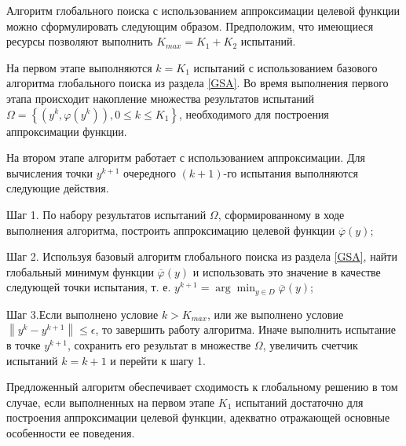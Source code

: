 \documentclass[mathematics,article,accept,pdftex,moreauthors]{Definitions/mdpi}
\begin{document}
Алгоритм глобального поиска с использованием аппроксимации целевой функции можно сформулировать следующим образом.
Предположим, что имеющиеся ресурсы позволяют выполнить $K_{max} = K_1 + K_2$ испытаний.

На первом этапе выполняются $k = K_1$ испытаний с использованием базового алгоритма глобального поиска из раздела \ref{GSA}.
Во время выполнения первого этапа происходит накопление множества результатов испытаний $\Omega = \left\{(y^k, \varphi(y^k)), 0\leq k\leq K_1\right\}$, необходимого для построения аппроксимации функции.

На втором этапе алгоритм работает с использованием аппроксимации. Для вычисления точки $y^{k+1}$ очередного $(k+1)$-го испытания выполняются следующие действия.

Шаг 1. По набору результатов испытаний $\Omega$, сформированному в ходе выполнения алгоритма, построить аппроксимацию целевой функции $\overline{\varphi}(y)$;

Шаг 2. Используя базовый алгоритм глобального поиска из раздела \ref{GSA}, найти глобальный минимум функции $\overline{\varphi}(y)$ и использовать это значение в качестве следующей точки испытания, т. е. $y ^{k+1} = \arg \min_{y \in D} \overline{\varphi}(y)$;

Шаг 3.Если выполнено условие $k>K_{max}$, или же выполнено условие $\left\|y^k - y^{k+1}\right\| \leq \epsilon$,  то завершить работу алгоритма.
Иначе выполнить испытание в точке $y^{k+1}$, сохранить его результат в множестве $\Omega$, увеличить счетчик испытаний $k = k+1$ и перейти к шагу 1.


Предложенный алгоритм обеспечивает сходимость к глобальному решению в том случае, если выполненных на первом этапе $K_1$ испытаний достаточно для построения аппроксимации целевой функции, адекватно отражающей основные особенности ее поведения.





\end{document}
